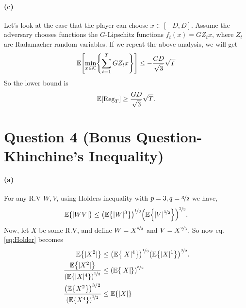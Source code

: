 \documentclass{article}
\DeclarePairedDelimiter\br{(}{)}%
\DeclarePairedDelimiter\brs{[}{]}%
\DeclarePairedDelimiter\brc{\{}{\}}%
\DeclarePairedDelimiter\abs{\lvert}{\rvert}%
\newcommand{\E}{\mathbb{E}}
\newcommand{\Kcal}{\mathcal{K}}
\newcommand{\Reg}{\text{Reg}}
\begin{document}
\paragraph{(c)}
Let's look at the case that the player can choose $x \in [-D,D]$.
Assume the adversary chooses functions the $G$-Lipschitz functions $f_t(x) = G Z_t x$, where $Z_t$ are Radamacher random variables.
If we repeat the above analysis, we will get  
\begin{equation*}
     \E \brs*{\min_{x \in \Kcal} \brc*{\sum_{t=1}^{T} G Z_t x}} \leq -\frac{GD}{\sqrt{3}} \sqrt{T} 
\end{equation*}
So the lower bound is 
\begin{equation*}
 \E \brs*{\Reg_T} \geq \frac{GD}{\sqrt{3}} \sqrt{T} .
 \end{equation*}
\section{Question 4 (Bonus Question-Khinchine's Inequality)}
\paragraph{(a)}

For any R.V $W,V$, using Holders inequality with $p=3,q=\nicefrac{3}{2}$ we have,
\begin{align} \label{eq:Holder}
    \E \brc*{\abs{WV}} \leq \br*{\E\brc*{\abs{W}^3}}^{\nicefrac{1}{3}} \br*{\E\brc*{\abs{V}^{\nicefrac{3}{2}}}}^{\nicefrac{2}{3}}.
\end{align}
Now, let $X$ be some R.V, and define $W=X^{\nicefrac{4}{3}}$ and 
 $V=X^{\nicefrac{2}{3}}$.
 So now eq. \ref{eq:Holder} becomes
 \begin{align*} 
    \E \brc*{\abs{X^2}} &\leq \br*{\E\brc*{\abs{X}^4}}^{\nicefrac{1}{3}} \br*{\E\brc*{\abs{X}^{1}}}^{\nicefrac{3}{2}}. \\
   \frac{ \E \brc*{\abs{X^2}} }{\br*{\E\brc*{\abs{X}^4}}^{\nicefrac{1}{3}}} &\leq \br*{\E\brc*{\abs{X}}}^{\nicefrac{3}{2}} \\
   \frac{\br*{ \E \brc*{X^2} }^{3/2}}{\br*{\E\brc*{X^4}}^{\nicefrac{1}{2}}} &\leq \E\brc*{\abs{X}}
\end{align*}

\end{document}
